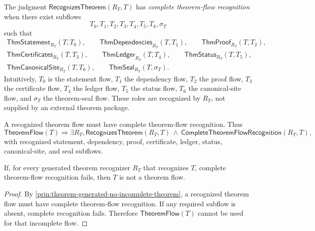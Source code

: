 \begin{definition}
\label{def:theorem-generated-complete-recognition}
The judgment $\mathsf{RecognizesTheorem}(R_T,T)$ has \emph{complete theorem-flow recognition} when there exist subflows
$$
  T_0,T_1,T_2,T_3,T_4,T_5,T_6,\sigma_T
$$
such that
$$
\begin{gathered}
  \mathsf{ThmStatement}_{R_T}(T,T_0),\qquad
  \mathsf{ThmDependencies}_{R_T}(T,T_1),\qquad
  \mathsf{ThmProof}_{R_T}(T,T_2),\\
  \mathsf{ThmCertificates}_{R_T}(T,T_3),\qquad
  \mathsf{ThmLedger}_{R_T}(T,T_4),\qquad
  \mathsf{ThmStatus}_{R_T}(T,T_5),\\
  \mathsf{ThmCanonicalSite}_{R_T}(T,T_6),\qquad
  \mathsf{ThmSeal}_{R_T}(T,\sigma_T).
\end{gathered}
$$
Intuitively, $T_0$ is the statement flow, $T_1$ the dependency flow, $T_2$ the proof flow, $T_3$ the certificate flow, $T_4$ the ledger flow, $T_5$ the status flow, $T_6$ the canonical-site flow, and $\sigma_T$ the theorem-seal flow. These roles are recognized by $R_T$, not supplied by an external theorem package.
\end{definition}

\begin{principle}
\label{prin:theorem-generated-no-incomplete-theorem}
A recognized theorem flow must have complete theorem-flow recognition. Thus
$$
  \mathsf{TheoremFlow}(T)
  \Longrightarrow
  \exists R_T,
  \mathsf{RecognizesTheorem}(R_T,T)
  \ \wedge\
  \mathsf{CompleteTheoremFlowRecognition}(R_T,T),
$$
with recognized statement, dependency, proof, certificate, ledger, status, canonical-site, and seal subflows.
\end{principle}

\begin{theorem}
\label{thm:theorem-generated-incomplete-not-theorem}
If, for every generated theorem recognizer $R_T$ that recognizes $T$, complete theorem-flow recognition fails, then $T$ is not a theorem flow.
\end{theorem}

\begin{proof}
By \autoref{prin:theorem-generated-no-incomplete-theorem}, a recognized theorem flow must have complete theorem-flow recognition. If any required subflow is absent, complete recognition fails. Therefore $\mathsf{TheoremFlow}(T)$ cannot be used for that incomplete flow.
\end{proof}

